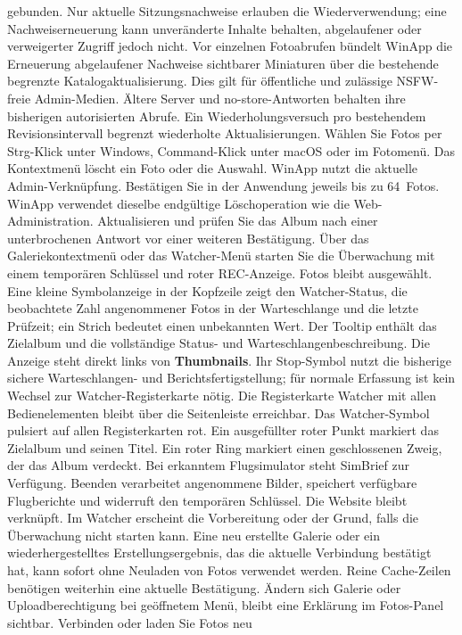 \documentclass[11pt,a4paper]{article}
\newcommand{\ui}[1]{\textbf{#1}}
\begin{document}
gebunden. Nur aktuelle Sitzungsnachweise erlauben die Wiederverwendung; eine
Nachweiserneuerung kann unveränderte Inhalte behalten, abgelaufener oder
verweigerter Zugriff jedoch nicht. Vor einzelnen Fotoabrufen bündelt WinApp
die Erneuerung abgelaufener Nachweise sichtbarer Miniaturen über die bestehende
begrenzte Katalogaktualisierung. Dies gilt für öffentliche und zulässige
NSFW-freie Admin-Medien. Ältere Server und no-store-Antworten behalten ihre
bisherigen autorisierten Abrufe. Ein Wiederholungsversuch pro bestehendem
Revisionsintervall begrenzt wiederholte Aktualisierungen.
Wählen Sie Fotos per Strg-Klick unter Windows, Command-Klick unter macOS
oder im Fotomenü. Das Kontextmenü löscht ein Foto oder die Auswahl.
WinApp nutzt die aktuelle Admin-Verknüpfung. Bestätigen Sie in der Anwendung
jeweils bis zu 64~Fotos. WinApp verwendet dieselbe endgültige
Löschoperation wie die Web-Administration. Aktualisieren und prüfen Sie das
Album nach einer unterbrochenen Antwort vor einer weiteren Bestätigung.
Über das Galeriekontextmenü oder das Watcher-Menü starten Sie die Überwachung mit einem
temporären Schlüssel und roter REC-Anzeige. Fotos bleibt ausgewählt.
Eine kleine Symbolanzeige in der Kopfzeile zeigt den Watcher-Status, die
beobachtete Zahl angenommener Fotos in der Warteschlange und die letzte
Prüfzeit; ein Strich bedeutet einen unbekannten Wert. Der Tooltip enthält
das Zielalbum und die vollständige Status- und Warteschlangenbeschreibung.
Die Anzeige steht direkt links von \ui{Thumbnails}. Ihr Stop-Symbol nutzt die
bisherige sichere Warteschlangen- und Berichtsfertigstellung; für normale
Erfassung ist kein Wechsel zur Watcher-Registerkarte nötig.
Die Registerkarte Watcher mit allen
Bedienelementen bleibt über die Seitenleiste erreichbar.
Das Watcher-Symbol pulsiert auf
allen Registerkarten rot. Ein ausgefüllter roter Punkt markiert das Zielalbum
und seinen Titel. Ein roter Ring markiert einen geschlossenen Zweig, der das
Album verdeckt. Bei erkanntem Flugsimulator
steht SimBrief zur Verfügung. Beenden verarbeitet angenommene Bilder,
speichert verfügbare Flugberichte und widerruft den temporären Schlüssel.
Die Website bleibt verknüpft. Im Watcher erscheint die Vorbereitung oder
der Grund, falls die Überwachung nicht starten kann. Eine neu erstellte
Galerie oder ein wiederhergestelltes Erstellungsergebnis, das die aktuelle
Verbindung bestätigt hat, kann sofort ohne Neuladen von Fotos verwendet
werden. Reine Cache-Zeilen benötigen weiterhin eine aktuelle Bestätigung.
Ändern sich Galerie oder Uploadberechtigung bei geöffnetem Menü, bleibt
eine Erklärung im Fotos-Panel sichtbar. Verbinden oder laden Sie Fotos neu
\end{document}
